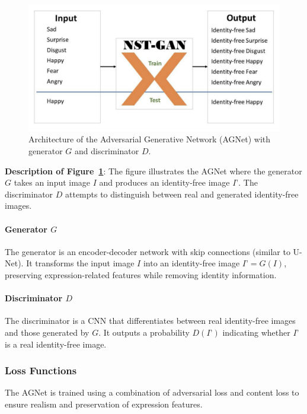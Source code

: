 \documentclass[lettersize,journal]{IEEEtran}
\begin{document}
\begin{figure}[htbp]
\centering
\includegraphics[width=0.8\linewidth]{AGNet_Architecture.png}
\caption{Architecture of the Adversarial Generative Network (AGNet) with generator $G$ and discriminator $D$.}
\label{fig:agnet_architecture}
\end{figure}

\textbf{Description of Figure~\ref{fig:agnet_architecture}}: The figure illustrates the AGNet where the generator $G$ takes an input image $I$ and produces an identity-free image $I’$. The discriminator $D$ attempts to distinguish between real and generated identity-free images.

\paragraph{Generator $G$}

The generator is an encoder-decoder network with skip connections (similar to U-Net). It transforms the input image $I$ into an identity-free image $I’ = G(I)$, preserving expression-related features while removing identity information.

\paragraph{Discriminator $D$}

The discriminator is a CNN that differentiates between real identity-free images and those generated by $G$. It outputs a probability $D(I’)$ indicating whether $I’$ is a real identity-free image.

\subsubsection{Loss Functions}

The AGNet is trained using a combination of adversarial loss and content loss to ensure realism and preservation of expression features.
\end{document}
